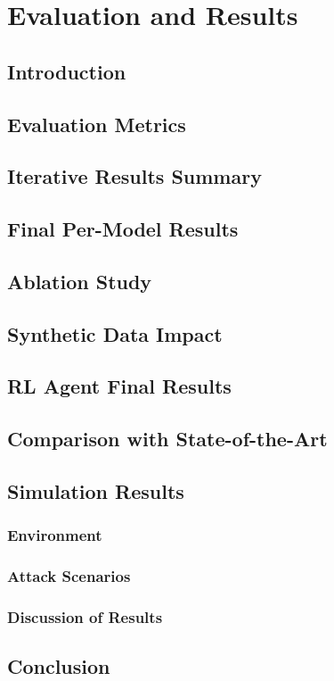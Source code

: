 \chapter{Evaluation and Results}
\label{chap:evaluation}
\section{Introduction}
\section{Evaluation Metrics}
\section{Iterative Results Summary}
\section{Final Per-Model Results}
\section{Ablation Study}
\section{Synthetic Data Impact}
\section{RL Agent Final Results}
\section{Comparison with State-of-the-Art}
\section{Simulation Results}
\subsection{Environment}
\subsection{Attack Scenarios}
\subsection{Discussion of Results}
\section{Conclusion}
